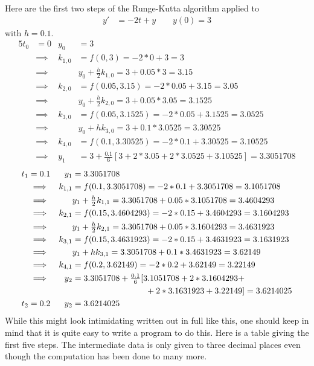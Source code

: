 Here are the first two steps of the Runge-Kutta algorithm applied to
\begin{align*}
y'&=-2t+y\qquad
y(0)  = 3
\end{align*}
with $h=0.1$. 
\begin{alignat*}{5}
t_0&=0 & y_0&=3 \\
 & \implies & k_{1,0}&=f(0,3)=-2*0+3 =3 \\
& \implies & &y_0+\tfrac{h}{2}k_{1,0}=3+0.05*3=3.15\\
 & \implies & k_{2,0}&=f(0.05,3.15)=-2*0.05+3.15 =3.05\\
& \implies & &y_0+\tfrac{h}{2}k_{2,0}=3+0.05*3.05=3.1525\\
 & \implies & k_{3,0}&=f(0.05,3.1525)=-2*0.05+3.1525 =3.0525 \\
& \implies & &y_0+hk_{3,0}=3+0.1*3.0525=3.30525\\
 & \implies & k_{4,0}&=f(0.1,3.30525)=-2*0.1+3.30525 =3.10525 \\
& \implies & y_1&=3+\tfrac{0.1}{6}[3+2*3.05+2*3.0525+3.10525]=3.3051708
\end{alignat*}
\begin{alignat*}{5}
t_1&=0.1 & y_1&=3.3051708 \\
 & \implies & k_{1,1}&=f(0.1,3.3051708)=-2*0.1+3.3051708 =3.1051708 \\
& \implies & &y_1+\tfrac{h}{2}k_{1,1}=3.3051708+0.05*3.1051708=3.4604293\\
 & \implies & k_{2,1}&=f(0.15,3.4604293)=-2*0.15+3.4604293 =3.1604293\\
& \implies & &y_1+\tfrac{h}{2}k_{2,1}=3.3051708+0.05*3.1604293=3.4631923\\
 & \implies & k_{3,1}&=f(0.15,3.4631923)=-2*0.15+3.4631923 =3.1631923 \\
& \implies & &y_1+hk_{3,1}=3.3051708+0.1*3.4631923=3.62149\\
 & \implies & k_{4,1}&=f(0.2,3.62149)=-2*0.2+3.62149 =3.22149 \\
& \implies & y_2&=3.3051708+\tfrac{0.1}{6}[3.1051708+2*3.1604293+\\
&  & &\hskip1.2in+2*3.1631923+3.22149]=3.6214025\\
t_2&=0.2 & y_2&=3.6214025 
\end{alignat*}
While this might look intimidating written out in full like this,
one should keep in mind that it is quite easy to write a program to do this.
Here is a table giving the first five steps. The intermediate data
is only given to three decimal places even though the computation has been
done to many more.

